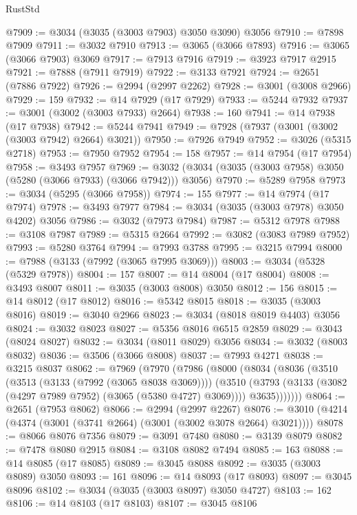 \begin{lexlean}{RustStd}
\begin{coremodule}
@7909 := @3034 (@3035 (@3003 @7903) @3050 @3090) @3056
@7910 := @7898 @7909
@7911 := @3032 @7910
@7913 := @3065 (@3066 @7893)
@7916 := @3065 (@3066 @7903) @3069
@7917 := @7913 @7916
@7919 := @3923 @7917 @2915
@7921 := @7888 (@7911 @7919)
@7922 := @3133 @7921
@7924 := @2651 (@7886 @7922)
@7926 := @2994 (@2997 @2262)
@7928 := @3001 (@3008 @2966)
@7929 := 159
@7932 := @14 @7929 (@17 @7929)
@7933 := @5244 @7932
@7937 := @3001 (@3002 (@3003 @7933) @2664)
@7938 := 160
@7941 := @14 @7938 (@17 @7938)
@7942 := @5244 @7941
@7949 := @7928 (@7937 (@3001 (@3002 (@3003 @7942) @2664) @3021))
@7950 := @7926 @7949
@7952 := @3026 (@5315 @2718)
@7953 := @7950 @7952
@7954 := 158
@7957 := @14 @7954 (@17 @7954)
@7958 := @3493 @7957
@7969 := @3032 (@3034 (@3035 (@3003 @7958) @3050 (@5280 (@3066 @7933) (@3066 @7942))) @3056)
@7970 := @5289 @7958
@7973 := @3034 (@5295 (@3066 @7958))
@7974 := 155
@7977 := @14 @7974 (@17 @7974)
@7978 := @3493 @7977
@7984 := @3034 (@3035 (@3003 @7978) @3050 @4202) @3056
@7986 := @3032 (@7973 @7984)
@7987 := @5312 @7978
@7988 := @3108 @7987
@7989 := @5315 @2664
@7992 := @3082 (@3083 @7989 @7952)
@7993 := @5280 @3764
@7994 := @7993 @3788
@7995 := @3215 @7994
@8000 := @7988 (@3133 (@7992 (@3065 @7995 @3069)))
@8003 := @3034 (@5328 (@5329 @7978))
@8004 := 157
@8007 := @14 @8004 (@17 @8004)
@8008 := @3493 @8007
@8011 := @3035 (@3003 @8008) @3050
@8012 := 156
@8015 := @14 @8012 (@17 @8012)
@8016 := @5342 @8015
@8018 := @3035 (@3003 @8016)
@8019 := @3040 @2966
@8023 := @3034 (@8018 @8019 @4403) @3056
@8024 := @3032 @8023
@8027 := @5356 @8016 @6515 @2859
@8029 := @3043 (@8024 @8027)
@8032 := @3034 (@8011 @8029) @3056
@8034 := @3032 (@8003 @8032)
@8036 := @3506 (@3066 @8008)
@8037 := @7993 @4271
@8038 := @3215 @8037
@8062 := @7969
    (@7970
      (@7986
        (@8000
          (@8034
            (@8036
              (@3510
                (@3513 (@3133 (@7992 (@3065 @8038 @3069))))
                (@3510
                  (@3793 (@3133 (@3082 (@4297 @7989 @7952) (@3065 (@5380 @4727) @3069))))
                  @3635)))))))
@8064 := @2651 (@7953 @8062)
@8066 := @2994 (@2997 @2267)
@8076 := @3010 (@4214 (@4374 (@3001 (@3741 @2664) (@3001 (@3002 @3078 @2664) @3021))))
@8078 := @8066 @8076 @7356
@8079 := @3091 @7480
@8080 := @3139 @8079
@8082 := @7478 @8080 @2915
@8084 := @3108 @8082 @7494
@8085 := 163
@8088 := @14 @8085 (@17 @8085)
@8089 := @3045 @8088
@8092 := @3035 (@3003 @8089) @3050
@8093 := 161
@8096 := @14 @8093 (@17 @8093)
@8097 := @3045 @8096
@8102 := @3034 (@3035 (@3003 @8097) @3050 @4727)
@8103 := 162
@8106 := @14 @8103 (@17 @8103)
@8107 := @3045 @8106

\end{coremodule}
\end{lexlean}
